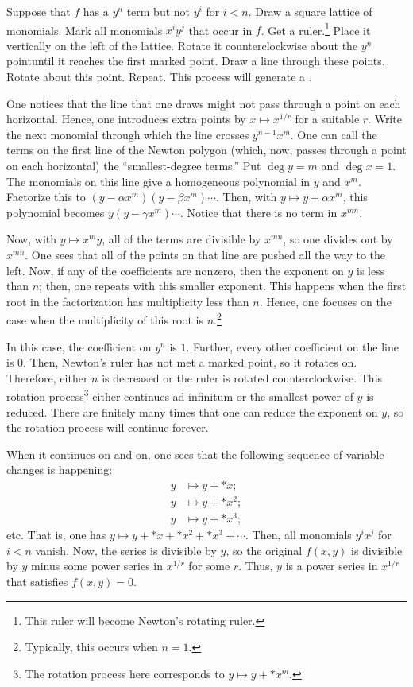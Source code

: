 \documentclass [11 pt, oneside, margin = 1 in] {article}
\begin{document}
\begin{esquisse}
	Suppose that $f$ has a $y^n$ term but not $y^i$ for $i<n$. Draw a square lattice of monomials. Mark all monomials $x^iy^j$ that occur in $f$. Get a ruler.\footnote{This ruler will become Newton's rotating ruler.} Place it vertically on the left of the lattice. Rotate it counterclockwise about the $y^n$ pointuntil it reaches the first marked point. Draw a line through these points. Rotate about this point. Repeat. This process will generate a .

	One notices that the line that one draws might not pass through a point on each horizontal. Hence, one introduces extra points by $x\longmapsto x^{1/r}$ for a suitable $r$. Write the next monomial through which the line crosses $y^{n-1}x^m$. One can call the terms on the first line of the Newton polygon (which, now, passes through a point on each horizontal) the ``smallest-degree terms.'' Put $\deg y = m$ and $\deg x = 1$. The monomials on this line give a homogeneous polynomial in $y$ and $x^m$. Factorize this to $(y-\alpha x^m) (y-\beta x^m)\cdots$. Then, with $y\longmapsto y+\alpha x^m$, this polynomial becomes $y(y-\gamma x^m)\cdots$. Notice that there is no term in $x^{mn}$.

	Now, with $y\longmapsto x^my$, all of the terms are divisible by $x^{mn}$, so one divides out by $x^{mn}$. One sees that all of the points on that line are pushed all the way to the left. Now, if any of the coefficients are nonzero, then the exponent on $y$ is less than $n$; then, one repeats with this smaller exponent. This happens when the first root in the factorization has multiplicity less than $n$. Hence, one focuses on the case when the multiplicity of this root is $n$.\footnote{Typically, this occurs when $n=1$.}

	In this case, the coefficient on $y^n$ is $1$. Further, every other coefficient on the line is $0$. Then, Newton's ruler has not met a marked point, so it rotates on. Therefore, either $n$ is decreased or the ruler is rotated counterclockwise. This rotation process\footnote{The rotation process here corresponds to $y\longmapsto y + *x^m$.} either continues ad infinitum or the smallest power of $y$ is reduced. There are finitely many times that one can reduce the exponent on $y$, so the rotation process will continue forever.

	When it continues on and on, one sees that the following sequence of variable changes is happening:
	\begin{align*}
		y &\longmapsto y + *x;\\
		y &\longmapsto y + *x^2;\\
		y &\longmapsto y + *x^3;
	\end{align*}
	etc. That is, one has $y\longmapsto y + *x + *x^2 + *x^3 + \cdots$. Then, all monomials $y^ix^j$ for $i< n$ vanish. Now, the series is divisible by $y$, so the original $f(x,y)$ is divisible by $y$ minus some power series in $x^{1/r}$ for some $r$. Thus, $y$ is a power series in $x^{1/r}$ that satisfies $f(x,y)=0$.
\end{esquisse}
\end{document}

